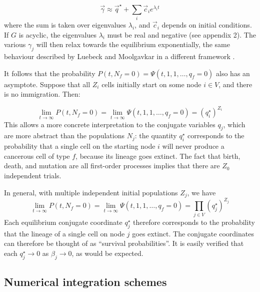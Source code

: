 \documentclass{article}
\begin{document}
\begin{equation}
    \vec{\gamma} \approx \vec{q}^\star + \sum_i \vec{c}_i e^{\lambda_i t}
\end{equation}
where the sum is taken over eigenvalues $\lambda_i$, and $\vec{c}_i$ depends on
initial conditions. If $G$ is acyclic, the eigenvalues $\lambda_i$ must be real
and negative (see appendix 2). The various $\gamma_j$ will then relax towards
the equilibrium exponentially, the same behaviour described by Luebeck and
Moolgavkar in a different framework \cite{meza2008age}.

It follows that the probability $P(t,N_f = 0) = \Psi(t, 1,1,\dots,q_f = 0)$ also
has an asymptote. Suppose that all $Z_i$ cells initially start on some node $i \in
V$, and there is no immigration. Then:

\begin{equation}
    \lim_{t\rightarrow \infty} P(t, N_f = 0) = 
    \lim_{t\rightarrow \infty} \Psi(t,1,1,\dots,q_f=0) =
    \left(q^\star_i\right)^{Z_i}
\end{equation}
This allows a more concrete interpretation to the conjugate variables $q_j$,
which are more abstract than the populations $N_j$: the
quantity $q^\star_i$ corresponds to the probability that a single cell on the
starting node $i$ will never produce a cancerous cell of type $f$, because its lineage goes
extinct. The fact that birth, death, and mutation are all first-order processes
implies that there are $Z_0$ independent trials.

In general, with multiple independent initial populations $Z_j$, we have 
\begin{equation}
    \lim_{t\rightarrow \infty} P(t, N_f = 0) = 
    \lim_{t\rightarrow \infty} \Psi(t,1,1,\dots,q_f=0) =
    \prod_{j \in V} \left(q^\star_j\right)^{Z_j}
\end{equation}
Each equilibrium conjugate coordinate $q^\star_j$ therefore corresponds to the
probability that the lineage of a single cell on node $j$ goes extinct. The
conjugate coordinates can therefore be thought of as ``survival probabilities''.
It is easily verified that each $q^\star_j \rightarrow 0$ as 
$\beta_j \rightarrow 0$, as would be expected.

\subsection{Numerical integration schemes}
\end{document}
